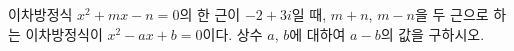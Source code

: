 이차방정식 $x^2+mx-n=0$의 한 근이 $-2+3i$일 때, $m+n$, $m-n$을 두 근으로 하는 이차방정식이 $x^2-ax+b=0$이다. 상수 $a$, $b$에 대하여 $a-b$의 값을 구하시오. 

